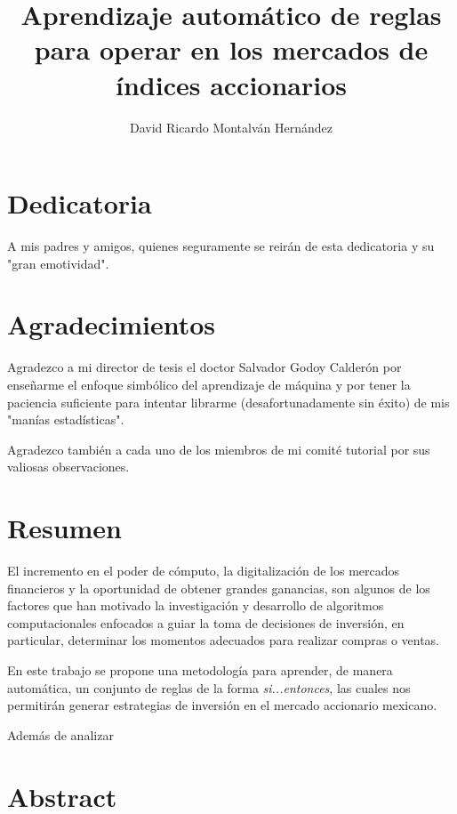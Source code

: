 \documentclass[12pt]{scrbook}
\title{Aprendizaje automático de reglas para operar en los mercados de índices accionarios}
\date{}
\author{David Ricardo Montalván Hernández}
\theoremstyle{break}
\theoremstyle{break}
\begin{document}
\maketitle
{} %
\renewcommand{\contentsname}{Contenido}
\tableofcontents
\renewcommand{\listfigurename}{Lista de imágenes}
\listoffigures
\renewcommand{\listtablename}{Lista de tablas}
\renewcommand\tablename{Tabla}
\renewcommand{\bibname}{Referencias}
\renewcommand{\figurename}{Imagen}
\listoftables

\chapter*{Dedicatoria}
A mis padres y amigos, quienes seguramente se reirán de esta dedicatoria y su "gran emotividad".

\chapter*{Agradecimientos}
Agradezco a mi director de tesis el doctor Salvador Godoy Calderón por enseñarme el enfoque simbólico del aprendizaje de máquina y por tener la paciencia suficiente para  intentar librarme (desafortunadamente sin éxito) de mis "manías estadísticas".

Agradezco también a cada uno de los miembros de mi comité tutorial por sus valiosas observaciones.

\chapter*{Resumen}
El incremento en el poder de cómputo, la digitalización de los mercados financieros y la oportunidad de obtener grandes ganancias, son algunos de los factores que han motivado la investigación y desarrollo de algoritmos computacionales enfocados a guiar la toma de decisiones de inversión, en particular, determinar los momentos adecuados para realizar compras o ventas.

En este trabajo se propone una metodología para aprender, de manera automática, un conjunto de reglas de la forma \textit{si...entonces}, las cuales nos permitirán generar estrategias de inversión en el mercado accionario mexicano.

Además de analizar

\chapter*{Abstract}
\end{document}
